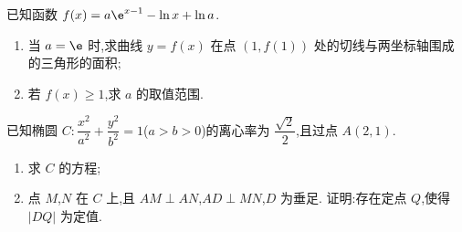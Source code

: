 \begin{problem}
已知函数 \(f(x)=a\e^{x-1}-\ln x+\ln a\).

\begin{enumerate}
\item 当 \(a=\e\) 时,求曲线 \(y=f(x)\) 在点 \(\left( 1,f(1) \right)\) 处的切线与两坐标轴围成的三角形的面积;
\item 若 \(f(x)\ge 1\),求 \(a\) 的取值范围.
\end{enumerate}
\end{problem}

\begin{problem}
已知椭圆 \(C:\dfrac{x^2}{a^2}+\dfrac{y^2}{b^2}=1\)(\(a>b>0\))的离心率为 \(\dfrac{\sqrt{2}}{2}\),且过点 \(A\left( 2,1 \right)\).

\begin{enumerate}
\item 求 \(C\) 的方程;
\item 点 \(M\),\(N\) 在 \(C\) 上,且 \(AM\perp AN\),\(AD\perp MN\),\(D\) 为垂足. 证明:存在定点 \(Q\),使得 \(|DQ|\) 为定值.
\end{enumerate}
\end{problem}

